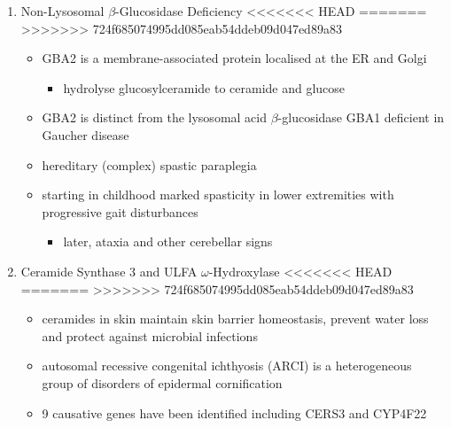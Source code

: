 \documentclass[fontsize=12pt]{scrartcl}
\begin{document}
\begin{enumerate}
\begin{enumerate}
\begin{enumerate}
\begin{enumerate}
\begin{enumerate}
\item Non-Lysosomal \(\beta\)-Glucosidase Deficiency
<<<<<<< HEAD
\label{sec:orgd90615a}
=======
\label{sec:org9d20049}
>>>>>>> 724f685074995dd085eab54ddeb09d047ed89a83
\begin{itemize}
\item GBA2 is a membrane-associated protein localised at the ER and Golgi
\begin{itemize}
\item hydrolyse glucosylceramide to ceramide and glucose
\end{itemize}
\item GBA2 is distinct from the lysosomal acid \(\beta\)-glucosidase GBA1 deficient in Gaucher disease
\item hereditary (complex) spastic paraplegia
\item starting in childhood marked spasticity in lower extremities with
progressive gait disturbances
\begin{itemize}
\item later, ataxia and other cerebellar signs
\end{itemize}
\end{itemize}

\item Ceramide Synthase 3 and ULFA \(\omega\)-Hydroxylase
<<<<<<< HEAD
\label{sec:org78f9483}
=======
\label{sec:orgac5a231}
>>>>>>> 724f685074995dd085eab54ddeb09d047ed89a83
\begin{itemize}
\item ceramides in skin maintain skin barrier homeostasis, prevent water
loss and protect against microbial infections
\item autosomal recessive congenital ichthyosis (ARCI) is a heterogeneous
group of disorders of epidermal cornification
\item 9 causative genes have been identified including CERS3 and CYP4F22 
\end{itemize}
\end{enumerate}


\end{enumerate}
\end{enumerate}
\end{enumerate}
\end{enumerate}
\end{document}
